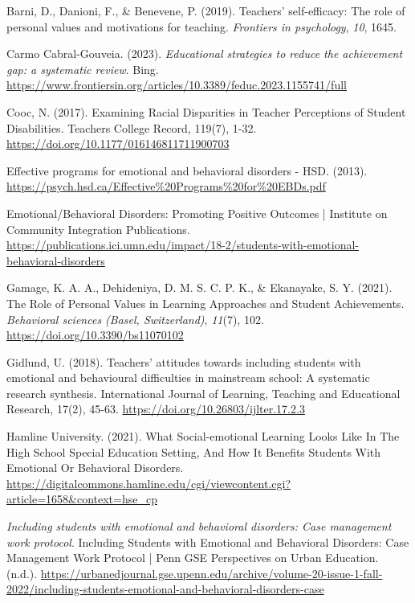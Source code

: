 \documentclass[11pt]{article}
\begin{document}
\begin{references}[Reference]
\item Barni, D., Danioni, F., \& Benevene, P. (2019). Teachers’ self-efficacy: The role of personal values and motivations for teaching. \textit{Frontiers in psychology}, \textit{10}, 1645.
\item Carmo Cabral-Gouveia. (2023). \textit{Educational strategies to reduce the achievement gap: a systematic review}. Bing. \url{https://www.frontiersin.org/articles/10.3389/feduc.2023.1155741/full}
\item Cooc, N. (2017). Examining Racial Disparities in Teacher Perceptions of Student Disabilities. Teachers College Record, 119(7), 1-32. \url{https://doi.org/10.1177/016146811711900703}
\item Effective programs for emotional and behavioral disorders - HSD. (2013). \url{https://psych.hsd.ca/Effective%20Programs%20for%20EBDs.pdf}
\item Emotional/Behavioral Disorders: Promoting Positive Outcomes | Institute on Community Integration Publications. \url{https://publications.ici.umn.edu/impact/18-2/students-with-emotional-behavioral-disorders}
\item Gamage, K. A. A., Dehideniya, D. M. S. C. P. K., \& Ekanayake, S. Y. (2021). The Role of Personal Values in Learning Approaches and Student Achievements. \textit{Behavioral sciences (Basel, Switzerland)}, \textit{11}(7), 102. \url{https://doi.org/10.3390/bs11070102}
\item Gidlund, U. (2018). Teachers’ attitudes towards including students with emotional and behavioural difficulties in mainstream school: A systematic research synthesis. International Journal of Learning, Teaching and Educational Research, 17(2), 45-63. \url{https://doi.org/10.26803/ijlter.17.2.3}
\item Hamline University. (2021). What Social-emotional Learning Looks Like In The High School Special Education Setting, And How It Benefits Students With Emotional Or Behavioral Disorders. \url{https://digitalcommons.hamline.edu/cgi/viewcontent.cgi?article=1658&context=hse_cp}
\item \textit{Including students with emotional and behavioral disorders: Case management work protocol}. Including Students with Emotional and Behavioral Disorders: Case Management Work Protocol | Penn GSE Perspectives on Urban Education. (n.d.). \url{https://urbanedjournal.gse.upenn.edu/archive/volume-20-issue-1-fall-2022/including-students-emotional-and-behavioral-disorders-case}

\end{references}
\end{document}
